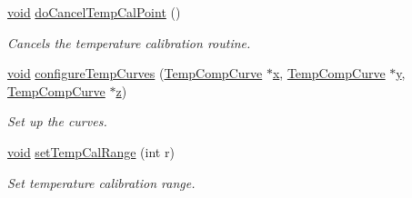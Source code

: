 \begin{DoxyCompactItemize}
\hyperlink{group___u_a_v_objects_plugin_ga444cf2ff3f0ecbe028adce838d373f5c}{void} \hyperlink{class_calibration_aee6c4261672e5a8c194c331a71963622}{do\-Cancel\-Temp\-Cal\-Point} ()
\begin{DoxyCompactList}\small\item\em \-Cancels the temperature calibration routine. \end{DoxyCompactList}\item 
\hyperlink{group___u_a_v_objects_plugin_ga444cf2ff3f0ecbe028adce838d373f5c}{void} \hyperlink{class_calibration_a7f1864654eed2d90d8bb5949c9249454}{configure\-Temp\-Curves} (\hyperlink{class_temp_comp_curve}{\-Temp\-Comp\-Curve} $\ast$\hyperlink{_o_p_plots_8m_a9336ebf25087d91c818ee6e9ec29f8c1}{x}, \hyperlink{class_temp_comp_curve}{\-Temp\-Comp\-Curve} $\ast$\hyperlink{_o_p_plots_8m_a2fb1c5cf58867b5bbc9a1b145a86f3a0}{y}, \hyperlink{class_temp_comp_curve}{\-Temp\-Comp\-Curve} $\ast$\hyperlink{_o_p_plots_8m_a25ed1bcb423b0b7200f485fc5ff71c8e}{z})
\begin{DoxyCompactList}\small\item\em \-Set up the curves. \end{DoxyCompactList}\item 
\hyperlink{group___u_a_v_objects_plugin_ga444cf2ff3f0ecbe028adce838d373f5c}{void} \hyperlink{class_calibration_a895658576c504c370a7a7929a832f1b1}{set\-Temp\-Cal\-Range} (int r)
\begin{DoxyCompactList}\small\item\em \-Set temperature calibration range. \end{DoxyCompactList}\end{DoxyCompactItemize}

